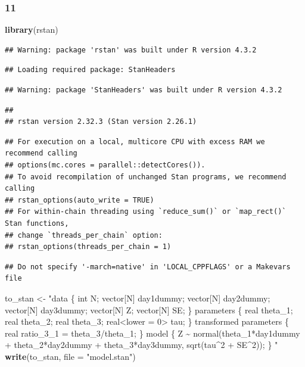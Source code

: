 \documentclass[
]{article}
\newenvironment{Shaded}{\begin{snugshade}}{\end{snugshade}}
\newcommand{\AttributeTok}[1]{\textcolor[rgb]{0.13,0.29,0.53}{#1}}
\newcommand{\FunctionTok}[1]{\textcolor[rgb]{0.13,0.29,0.53}{\textbf{#1}}}
\newcommand{\NormalTok}[1]{#1}
\newcommand{\OtherTok}[1]{\textcolor[rgb]{0.56,0.35,0.01}{#1}}
\newcommand{\StringTok}[1]{\textcolor[rgb]{0.31,0.60,0.02}{#1}}
\begin{document}
\hypertarget{section-7}{%
\subsubsection{11}\label{section-7}}

\begin{Shaded}
\begin{Highlighting}[]
\FunctionTok{library}\NormalTok{(rstan)}
\end{Highlighting}
\end{Shaded}

\begin{verbatim}
## Warning: package 'rstan' was built under R version 4.3.2
\end{verbatim}

\begin{verbatim}
## Loading required package: StanHeaders
\end{verbatim}

\begin{verbatim}
## Warning: package 'StanHeaders' was built under R version 4.3.2
\end{verbatim}

\begin{verbatim}
## 
## rstan version 2.32.3 (Stan version 2.26.1)
\end{verbatim}

\begin{verbatim}
## For execution on a local, multicore CPU with excess RAM we recommend calling
## options(mc.cores = parallel::detectCores()).
## To avoid recompilation of unchanged Stan programs, we recommend calling
## rstan_options(auto_write = TRUE)
## For within-chain threading using `reduce_sum()` or `map_rect()` Stan functions,
## change `threads_per_chain` option:
## rstan_options(threads_per_chain = 1)
\end{verbatim}

\begin{verbatim}
## Do not specify '-march=native' in 'LOCAL_CPPFLAGS' or a Makevars file
\end{verbatim}

\begin{Shaded}
\begin{Highlighting}[]
\NormalTok{to\_stan }\OtherTok{\textless{}{-}} \StringTok{"data \{}
\StringTok{int N;}
\StringTok{vector[N] day1dummy;}
\StringTok{vector[N] day2dummy;}
\StringTok{vector[N] day3dummy;}
\StringTok{vector[N] Z;}
\StringTok{vector[N] SE;}
\StringTok{\}}
\StringTok{parameters \{}
\StringTok{real theta\_1;}
\StringTok{real theta\_2;}
\StringTok{real theta\_3;}
\StringTok{real\textless{}lower = 0\textgreater{} tau;}
\StringTok{\}}
\StringTok{transformed parameters \{}
\StringTok{real ratio\_3\_1 = theta\_3/theta\_1;}
\StringTok{\}}
\StringTok{model \{}
\StringTok{Z \textasciitilde{} normal(theta\_1*day1dummy + theta\_2*day2dummy + theta\_3*day3dummy, sqrt(tau\^{}2 + SE\^{}2));}
\StringTok{\}}
\StringTok{"}
\FunctionTok{write}\NormalTok{(to\_stan, }\AttributeTok{file =} \StringTok{"model.stan"}\NormalTok{)}
\end{Highlighting}
\end{Shaded}
\end{document}
